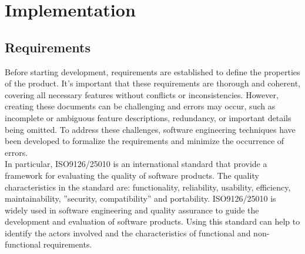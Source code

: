 \chapter{Implementation}

\section{Requirements}
Before starting development, requirements are established to define the properties of the product. It's important that these requirements are thorough and coherent, covering all necessary features without conflicts or inconsistencies. However, creating these documents can be challenging and errors may occur, such as incomplete or ambiguous feature descriptions, redundancy, or important details being omitted. To address these challenges, software engineering techniques have been developed to formalize the requirements and minimize the occurrence of errors.\\
In particular, ISO9126/25010 is an international standard that provide a framework for evaluating the quality of software products. The quality characteristics in the standard are: functionality, reliability, usability, efficiency, maintainability, ''security, compatibility'' and portability.
ISO9126/25010 is widely used in software engineering and quality assurance to guide the development and evaluation of software products. %
Using this standard can help to identify the actors involved and the characteristics of functional and non-functional requirements.

